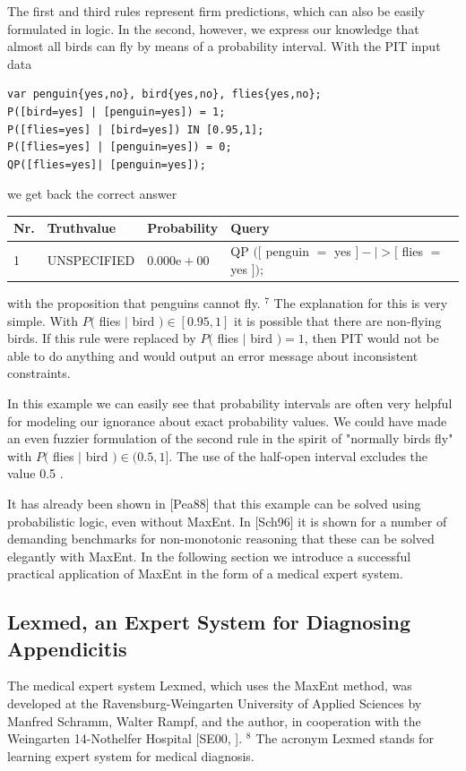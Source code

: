 \documentclass[10pt]{book}
\begin{document}
The first and third rules represent firm predictions, which can also be easily formulated in logic. In the second, however, we express our knowledge that almost all birds can fly by means of a probability interval. With the PIT input data

\begin{verbatim}
var penguin{yes,no}, bird{yes,no}, flies{yes,no};
P([bird=yes] | [penguin=yes]) = 1;
P([flies=yes] | [bird=yes]) IN [0.95,1];
P([flies=yes] | [penguin=yes]) = 0;
QP([flies=yes]| [penguin=yes]);
\end{verbatim}

we get back the correct answer

\begin{center}
\begin{tabular}{llll}
\hline
Nr. & Truthvalue & Probability & Query \\
\hline
1 & UNSPECIFIED & $0.000 \mathrm{e}+00$ & QP $([$ penguin $=$ yes $]-\mid>[$ flies $=$ yes $]) ;$ \\
\hline
\end{tabular}
\end{center}

with the proposition that penguins cannot fly. ${ }^{7}$ The explanation for this is very simple. With $P($ flies $\mid$ bird $) \in[0.95,1]$ it is possible that there are non-flying birds. If this rule were replaced by $P($ flies $\mid$ bird $)=1$, then PIT would not be able to do anything and would output an error message about inconsistent constraints.

In this example we can easily see that probability intervals are often very helpful for modeling our ignorance about exact probability values. We could have made an even fuzzier formulation of the second rule in the spirit of "normally birds fly" with $P($ flies $\mid$ bird $) \in(0.5,1]$. The use of the half-open interval excludes the value 0.5 .

It has already been shown in [Pea88] that this example can be solved using probabilistic logic, even without MaxEnt. In [Sch96] it is shown for a number of demanding benchmarks for non-monotonic reasoning that these can be solved elegantly with MaxEnt. In the following section we introduce a successful practical application of MaxEnt in the form of a medical expert system.

\subsection{Lexmed, an Expert System for Diagnosing Appendicitis}
The medical expert system Lexmed, which uses the MaxEnt method, was developed at the Ravensburg-Weingarten University of Applied Sciences by Manfred Schramm, Walter Rampf, and the author, in cooperation with the Weingarten 14-Nothelfer Hospital [SE00, \cite{lexmed1999}]. ${ }^{8}$ The acronym Lexmed stands for learning expert system for medical diagnosis.
\end{document}
